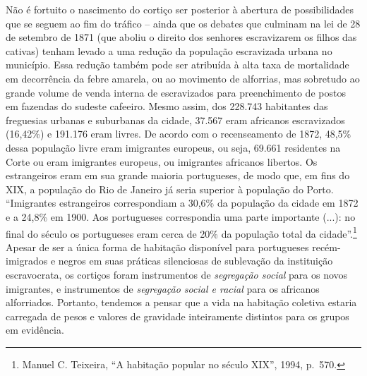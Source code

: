Não é fortuito o nascimento do cortiço ser posterior à abertura de
possibilidades que se seguem ao fim do tráfico -- ainda que os debates
que culminam na lei de 28 de setembro de 1871 (que aboliu o direito dos
senhores escravizarem os filhos das cativas) tenham levado a uma redução
da população escravizada urbana no município. Essa redução também pode
ser atribuída à alta taxa de mortalidade em decorrência da febre
amarela, ou ao movimento de alforrias, mas sobretudo ao grande volume de
venda interna de escravizados para preenchimento de postos em fazendas
do sudeste cafeeiro. Mesmo assim, dos 228.743 habitantes das freguesias
urbanas e suburbanas da cidade, 37.567 eram africanos escravizados
(16,42\%) e 191.176 eram livres. De acordo com o recenseamento de 1872,
48,5\% dessa população livre eram imigrantes europeus, ou seja, 69.661
residentes na Corte ou eram imigrantes europeus, ou imigrantes africanos
libertos. Os estrangeiros eram em sua grande maioria portugueses, de
modo que, em fins do XIX, a população do Rio de Janeiro já seria
superior à população do Porto. ``Imigrantes estrangeiros correspondiam a
30,6\% da população da cidade em 1872 e a 24,8\% em 1900. Aos
portugueses correspondia uma parte importante (...): no final do século
os portugueses eram cerca de 20\% da população total da
cidade''.\footnote{Manuel C. Teixeira, ``A habitação popular no século
  XIX'', 1994, p.~570.} Apesar de ser a única forma de habitação
disponível para portugueses recém-imigrados e negros em suas práticas
silenciosas de sublevação da instituição escravocrata, os cortiços foram
instrumentos de \emph{segregação social} para os novos imigrantes, e
instrumentos de \emph{segregação social e racial} para os africanos
alforriados. Portanto, tendemos a pensar que a vida na habitação
coletiva estaria carregada de pesos e valores de gravidade inteiramente
distintos para os grupos em evidência.

